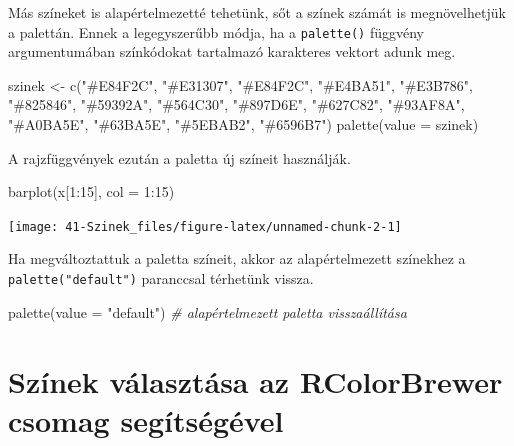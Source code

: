 \documentclass[
]{book}
\newenvironment{Shaded}{\begin{snugshade}}{\end{snugshade}}
\newcommand{\AttributeTok}[1]{\textcolor[rgb]{0.77,0.63,0.00}{#1}}
\newcommand{\CommentTok}[1]{\textcolor[rgb]{0.56,0.35,0.01}{\textit{#1}}}
\newcommand{\DecValTok}[1]{\textcolor[rgb]{0.00,0.00,0.81}{#1}}
\newcommand{\FunctionTok}[1]{\textcolor[rgb]{0.00,0.00,0.00}{#1}}
\newcommand{\NormalTok}[1]{#1}
\newcommand{\OtherTok}[1]{\textcolor[rgb]{0.56,0.35,0.01}{#1}}
\newcommand{\SpecialCharTok}[1]{\textcolor[rgb]{0.00,0.00,0.00}{#1}}
\newcommand{\StringTok}[1]{\textcolor[rgb]{0.31,0.60,0.02}{#1}}
\begin{document}
Más színeket is alapértelmezetté tehetünk, sőt a színek számát is megnövelhetjük a palettán. Ennek a legegyszerűbb módja, ha a \texttt{palette()} függvény argumentumában színkódokat tartalmazó karakteres vektort adunk meg.

\begin{Shaded}
\begin{Highlighting}[]
\NormalTok{szinek }\OtherTok{\textless{}{-}} \FunctionTok{c}\NormalTok{(}\StringTok{"\#E84F2C"}\NormalTok{, }\StringTok{"\#E31307"}\NormalTok{, }\StringTok{"\#E84F2C"}\NormalTok{, }\StringTok{"\#E4BA51"}\NormalTok{, }\StringTok{"\#E3B786"}\NormalTok{, }\StringTok{"\#825846"}\NormalTok{, }
    \StringTok{"\#59392A"}\NormalTok{, }\StringTok{"\#564C30"}\NormalTok{, }\StringTok{"\#897D6E"}\NormalTok{, }\StringTok{"\#627C82"}\NormalTok{, }\StringTok{"\#93AF8A"}\NormalTok{, }\StringTok{"\#A0BA5E"}\NormalTok{, }\StringTok{"\#63BA5E"}\NormalTok{, }
    \StringTok{"\#5EBAB2"}\NormalTok{, }\StringTok{"\#6596B7"}\NormalTok{)}
\FunctionTok{palette}\NormalTok{(}\AttributeTok{value =}\NormalTok{ szinek)}
\end{Highlighting}
\end{Shaded}

A rajzfüggvények ezután a paletta új színeit használják.

\begin{Shaded}
\begin{Highlighting}[]
\FunctionTok{barplot}\NormalTok{(x[}\DecValTok{1}\SpecialCharTok{:}\DecValTok{15}\NormalTok{], }\AttributeTok{col =} \DecValTok{1}\SpecialCharTok{:}\DecValTok{15}\NormalTok{)}
\end{Highlighting}
\end{Shaded}

\begin{center}\texttt{[image: 41-Szinek\_files/figure-latex/unnamed-chunk-2-1]} \end{center}

Ha megváltoztattuk a paletta színeit, akkor az alapértelmezett színekhez a \texttt{palette("default")} paranccsal térhetünk vissza.

\begin{Shaded}
\begin{Highlighting}[]
\FunctionTok{palette}\NormalTok{(}\AttributeTok{value =} \StringTok{"default"}\NormalTok{)  }\CommentTok{\# alapértelmezett paletta visszaállítása}
\end{Highlighting}
\end{Shaded}

\hypertarget{szinek-valasztasa-rcolorbrewer}{%
\section{Színek választása az RColorBrewer csomag segítségével}\label{szinek-valasztasa-rcolorbrewer}}
\end{document}
